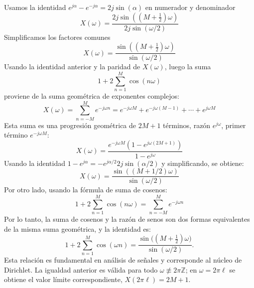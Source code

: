 \documentclass[
  11pt,
  letterpaper,
   addpoints,
   answers
  ]{exam}
\begin{document}
\begin{questions}
\begin{solution}
\[\]
Usamos la identidad $e^{j\alpha}-e^{-j\alpha}=2j\sin(\alpha)$ en numerador y denominador
\[
X(\omega) = \frac{2j\sin\left((M+\tfrac{1}{2})\omega\right)}{2j\sin(\omega/2)}
\]
Simplificamos los factores comunes
\[
X(\omega) = \frac{\sin\left((M+\tfrac{1}{2})\omega\right)}{\sin(\omega/2)}
\]
Usando la identidad anterior y la paridad de $X(\omega)$, luego la suma
\[
1 + 2\sum_{n=1}^M \cos(n\omega)
\]
proviene de la suma geométrica de exponentes complejos:
\[
X(\omega) = \sum_{n=-M}^M e^{-j\omega n} = e^{-j\omega M} + e^{-j\omega(M-1)} + \cdots + e^{j\omega M}
\]
Esta suma es una progresión geométrica de $2M+1$ términos, razón $e^{j\omega}$, primer término $e^{-j\omega M}$:
\[
X(\omega) = \frac{e^{-j\omega M}(1 - e^{j\omega(2M+1)})}{1 - e^{j\omega}}
\]
Usando la identidad $1 - e^{j\alpha} = -e^{j\alpha/2}2j\sin(\alpha/2)$ y simplificando, se obtiene:
\[
X(\omega) = \frac{\sin((M+1/2)\omega)}{\sin(\omega/2)}
\]
Por otro lado, usando la fórmula de suma de cosenos:
\[
1 + 2\sum_{n=1}^M \cos(n\omega) = \sum_{n=-M}^M e^{-j\omega n}
\]
Por lo tanto, la suma de cosenos y la razón de senos son dos formas equivalentes de la misma suma geométrica, y la identidad es:
\[
\boxed{\;
1+2\sum_{n=1}^{M}\cos(\omega n)
=\frac{\sin\!\big((M+\tfrac12)\omega\big)}{\sin(\omega/2)}. \;}
\]
Esta relación es fundamental en análisis de señales y corresponde al núcleo de Dirichlet.
La igualdad anterior es válida para todo $\omega\not\equiv 2\pi\mathbb{Z}$; en $\omega=2\pi\ell$ se obtiene el valor límite correspondiente, $X(2\pi\ell)=2M+1$.

\begin{figure}[H]
\centering
{}
\end{figure}
\end{solution}
\end{questions}
\end{document}
